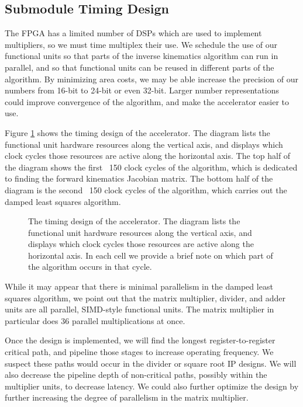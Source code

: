 \subsection{Submodule Timing Design}

The FPGA has a limited number of DSPs which are used to implement multipliers, so we must time multiplex their use. We schedule the use of our functional units so that parts of the inverse kinematics algorithm can run in parallel, and so that functional units can be reused in different parts of the algorithm. By minimizing area costs, we may be able increase the precision of our numbers from 16-bit to 24-bit or even 32-bit. Larger number representations could improve convergence of the algorithm, and make the accelerator easier to use.

Figure \ref{fig:schedule} shows the timing design of the accelerator. The diagram lists the functional unit hardware resources along the vertical axis, and displays which clock cycles those resources are active along the horizontal axis. The top half of the diagram shows the first ~150 clock cycles of the algorithm, which is dedicated to finding the forward kinematics Jacobian matrix. The bottom half of the diagram is the second ~150 clock cycles of the algorithm, which carries out the damped least squares algorithm.

\begin{figure}[ht]
\center
{}
\caption{The timing design of the accelerator. The diagram lists the functional unit hardware resources along the vertical axis, and displays which clock cycles those resources are active along the horizontal axis. In each cell we provide a brief note on which part of the algorithm occurs in that cycle.}
\label{fig:schedule}
\end{figure}

While it may appear that there is minimal parallelism in the damped least squares algorithm, we point out that the matrix multiplier, divider, and adder units are all parallel, SIMD-style functional units. The matrix multiplier in particular does 36 parallel multiplications at once.

Once the design is implemented, we will find the longest register-to-register critical path, and pipeline those stages to increase operating frequency. We suspect these paths would occur in the divider or square root IP designs. We will also decrease the pipeline depth of non-critical paths, possibly within the multiplier units, to decrease latency. We could also further optimize the design by further increasing the degree of parallelism in the matrix multiplier.